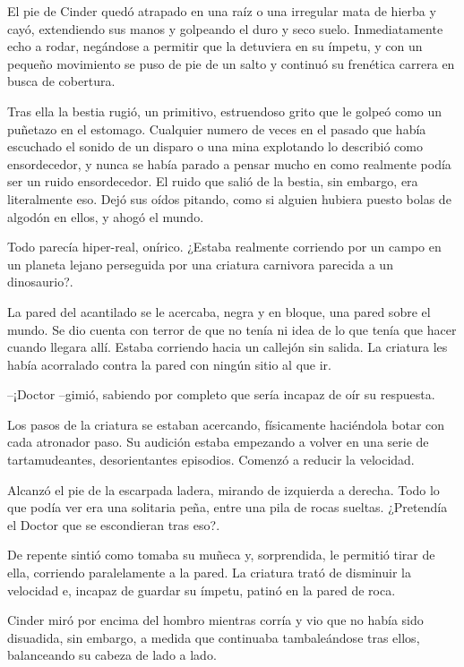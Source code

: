 El pie de Cinder quedó atrapado en una raíz o una irregular mata de hierba y cayó, extendiendo sus manos y golpeando el duro y seco suelo. Inmediatamente echo a rodar, negándose a permitir que la detuviera en su ímpetu, y con un pequeño movimiento se puso de pie de un salto y continuó su frenética carrera en busca de cobertura.

Tras ella la bestia rugió, un primitivo, estruendoso grito que le golpeó como un puñetazo en el estomago. Cualquier numero de veces en el pasado que había escuchado el sonido de un disparo o una mina explotando lo describió como ensordecedor, y nunca se había parado a pensar mucho en como realmente podía ser un ruido ensordecedor. El ruido que salió de la bestia, sin embargo, era literalmente eso. Dejó sus oídos pitando, como si alguien hubiera puesto bolas de algodón en ellos, y ahogó el mundo.

Todo parecía hiper-real, onírico. ¿Estaba realmente corriendo por un campo en un planeta lejano perseguida por una criatura carnivora parecida a un dinosaurio?.

La pared del acantilado se le acercaba, negra y en bloque, una pared sobre el mundo. Se dio cuenta con terror de que no tenía ni idea de lo que tenía que hacer cuando llegara allí. Estaba corriendo hacia un callejón sin salida. La criatura les había acorralado contra la pared con ningún sitio al que ir.



--¡Doctor --gimió, sabiendo por completo que sería incapaz de oír su respuesta.



Los pasos de la criatura se estaban acercando, físicamente haciéndola botar con cada atronador paso. Su audición estaba empezando a volver en una serie de tartamudeantes, desorientantes episodios. Comenzó a reducir la velocidad.

Alcanzó el pie de la escarpada ladera, mirando de izquierda a derecha. Todo lo que podía ver era una solitaria peña, entre una pila de rocas sueltas. ¿Pretendía el Doctor que se escondieran tras eso?.

De repente sintió como tomaba su muñeca y, sorprendida, le permitió tirar de ella, corriendo paralelamente a la pared. La criatura trató de disminuir la velocidad e, incapaz de guardar su ímpetu, patinó en la pared de roca.

Cinder miró por encima del hombro mientras corría y vio que no había sido disuadida, sin embargo, a medida que continuaba tambaleándose tras ellos, balanceando su cabeza de lado a lado.



